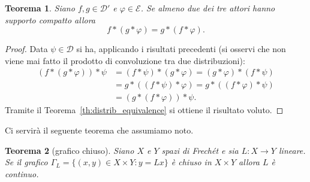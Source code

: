 \documentclass[italian,a4paper,oneside,headinclude]{scrbook}
\renewcommand{\phi}{\varphi}
\newcommand{\D}{\mathcal D}
\newcommand{\E}{\mathcal E}
\newtheorem{theorem}{Teorema}
\begin{document}
\begin{theorem}
  Siano $f,g\in \D'$ e $\phi \in \E$. Se almeno due dei tre attori
  hanno supporto compatto allora
  \[
    f * (g*\phi) = g * (f * \phi).
  \]
\end{theorem}
%
\begin{proof}
  Data $\psi\in \D$ si ha, applicando i risultati precedenti (si
  osservi che non viene mai fatto il prodotto di convoluzione tra due
  distribuzioni):
  \begin{align*}
    (f * (g * \phi)) * \psi
    &= (f* \psi) * (g * \phi)
    = (g*\phi) * (f * \psi)\\
    &= g * ((f*\psi) * \phi)
    = g * ((f*\phi) * \psi)\\
    &= (g * (f*\phi)) * \psi.
  \end{align*}
Tramite il Teorema~\ref{th:distrib_equivalence} si ottiene il
risultato voluto.
\end{proof}

Ci servirà il seguente teorema che assumiamo noto.
\begin{theorem}[grafico chiuso]
  \cite[2.15]{Rudin}
  Siano $X$ e $Y$ spazi di Frechét e sia $L\colon X \to Y$ lineare. Se
  il grafico $\Gamma_L = \{(x, y)\in X\times Y\colon y=Lx\}$ è
  chiuso in $X\times Y$ allora $L$ è continuo.
\end{theorem}
\end{document}
